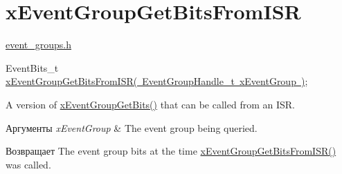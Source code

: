 \hypertarget{group__x_event_group_get_bits_from_i_s_r}{}\section{x\+Event\+Group\+Get\+Bits\+From\+I\+SR}
\label{group__x_event_group_get_bits_from_i_s_r}
\mbox{\hyperlink{event__groups_8h}{event\+\_\+groups.\+h}} 
\begin{DoxyPre}
   EventBits\_t \mbox{\hyperlink{event__groups_8h_a95822db4357d0b77c35aed0c7427eca0}{xEventGroupGetBitsFromISR( EventGroupHandle\_t xEventGroup )}};
\end{DoxyPre}


A version of \mbox{\hyperlink{event__groups_8h_a0ae86f092fb07ccb475ae938f9a12584}{x\+Event\+Group\+Get\+Bits()}} that can be called from an I\+SR.


\begin{DoxyParams}{Аргументы}
{\em x\+Event\+Group} & The event group being queried.\\
\hline
\end{DoxyParams}
\begin{DoxyReturn}{Возвращает}
The event group bits at the time \mbox{\hyperlink{event__groups_8h_a95822db4357d0b77c35aed0c7427eca0}{x\+Event\+Group\+Get\+Bits\+From\+I\+S\+R()}} was called. 
\end{DoxyReturn}
